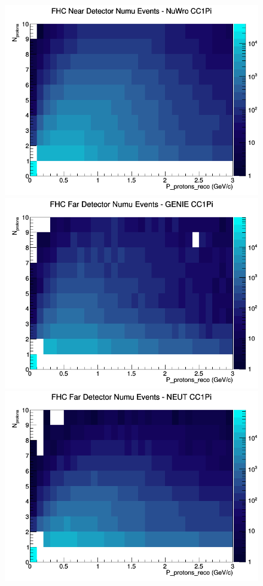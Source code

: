 \begin{figure}[h]
\includegraphics[width=\linewidth]{eff_N_P/GAr/protons/CC1Pi_FHC_ND_numu_N_P_NuWro.png}
\endminipage
\newline
{}
\includegraphics[width=\linewidth]{eff_N_P/GAr/protons/CC1Pi_FHC_FD_numu_N_P_GENIE.png}
\endminipage
{}
\includegraphics[width=\linewidth]{eff_N_P/GAr/protons/CC1Pi_FHC_FD_numu_N_P_NEUT.png}

\end{figure}
